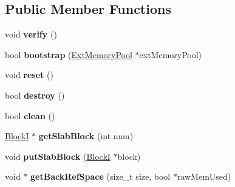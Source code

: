 \subsection*{Public Member Functions}
\begin{DoxyCompactItemize}
\item 
\hypertarget{classrml_1_1internal_1_1Backend_a165dbdb10e5b3cb7ba607d608cc89ebf}{}void {\bfseries verify} ()\label{classrml_1_1internal_1_1Backend_a165dbdb10e5b3cb7ba607d608cc89ebf}

\item 
\hypertarget{classrml_1_1internal_1_1Backend_a66650899df29e04f098f34dc66a12f25}{}bool {\bfseries bootstrap} (\hyperlink{structrml_1_1internal_1_1ExtMemoryPool}{Ext\+Memory\+Pool} $\ast$ext\+Memory\+Pool)\label{classrml_1_1internal_1_1Backend_a66650899df29e04f098f34dc66a12f25}

\item 
\hypertarget{classrml_1_1internal_1_1Backend_ac08d1da332ea0eff2ff531cc0b082b90}{}void {\bfseries reset} ()\label{classrml_1_1internal_1_1Backend_ac08d1da332ea0eff2ff531cc0b082b90}

\item 
\hypertarget{classrml_1_1internal_1_1Backend_a62ab2bf2685173c29ec2779e0f410482}{}bool {\bfseries destroy} ()\label{classrml_1_1internal_1_1Backend_a62ab2bf2685173c29ec2779e0f410482}

\item 
\hypertarget{classrml_1_1internal_1_1Backend_a6d947d4892bfecd23f011d89f97cb883}{}bool {\bfseries clean} ()\label{classrml_1_1internal_1_1Backend_a6d947d4892bfecd23f011d89f97cb883}

\item 
\hypertarget{classrml_1_1internal_1_1Backend_a303d60718dc6032c450ee4bc01f5f934}{}\hyperlink{classrml_1_1internal_1_1BlockI}{Block\+I} $\ast$ {\bfseries get\+Slab\+Block} (int num)\label{classrml_1_1internal_1_1Backend_a303d60718dc6032c450ee4bc01f5f934}

\item 
\hypertarget{classrml_1_1internal_1_1Backend_a320ac9ed134822e8af21190561bed85e}{}void {\bfseries put\+Slab\+Block} (\hyperlink{classrml_1_1internal_1_1BlockI}{Block\+I} $\ast$block)\label{classrml_1_1internal_1_1Backend_a320ac9ed134822e8af21190561bed85e}

\item 
\hypertarget{classrml_1_1internal_1_1Backend_ab1f1296fdb1f641d5c1d9bb7e1ddcfd7}{}void $\ast$ {\bfseries get\+Back\+Ref\+Space} (size\+\_\+t size, bool $\ast$raw\+Mem\+Used)\label{classrml_1_1internal_1_1Backend_ab1f1296fdb1f641d5c1d9bb7e1ddcfd7}


\end{DoxyCompactItemize}
